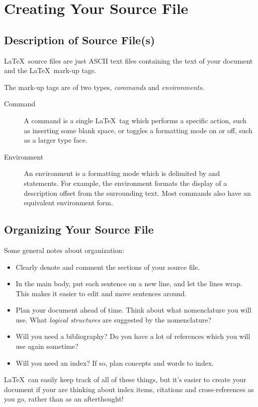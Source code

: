 \chapter{Creating Your Source File}
\section{Description of Source File(s)}
\LaTeX\ source files are just ASCII text files containing the text of your document and the \LaTeX\ mark-up tags.

The mark-up tags are of two types, \emph{commands} and \emph{environments}.
\begin{description}
\item[Command] A command is a single \LaTeX\ tag which performs a specific action, such as inserting some blank space, or toggles a formatting mode on or off, such as a larger type face.
\item[Environment] An environment is a formatting mode which is delimited by  and  statements.
For example, the  environment formats the display of a description offset from the surrounding text. 
Most commands also have an equivalent environment form.
\end{description}
\section{Organizing Your Source File}
Some general notes about organization:
\begin{itemize}
\item Clearly denote and comment the sections of your source file.
\item In the main body, put each sentence on a new line, and let the lines wrap.
This makes it easier to edit and move sentences around.
\item Plan your document ahead of time.
Think about what nomenclature you will use.
What \emph{logical structures} are suggested by the nomenclature? 
\item Will you need a bibliography? Do you have a lot of references which you will use again sometime?
\item Will you need an index? If so, plan concepts and words to index.
\end{itemize}
\LaTeX\ can easily keep track of all of these things, but it's easier to create your document if your are thinking about index items, citations and cross-references as you go, rather than as an afterthought! 
